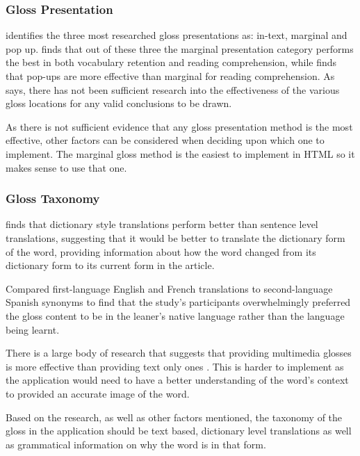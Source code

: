 \subsubsection{Gloss Presentation}

\textcite{chen2016} identifies the three most researched gloss presentations as: in-text, marginal and pop up.  \textcite{abuseileek2008} finds that out of these three the marginal presentation category performs the best in both vocabulary retention and reading comprehension, while \textcite{marefat2016} finds that pop-ups are more effective than marginal for reading comprehension. As \textcite{chen2016} says, there has not been sufficient research into the effectiveness of the various gloss locations for any valid conclusions to be drawn.

As there is not sufficient evidence that any gloss presentation method is the most effective, other factors can be considered when deciding upon which one to implement. The marginal gloss method is the easiest to implement in HTML so it makes sense to use that one. 

\subsubsection{Gloss Taxonomy}

\textcite{gettys2001} finds that dictionary style translations perform better than sentence level translations, suggesting that it would be better
 to translate the dictionary form of the word, providing information about how the word changed from its dictionary form to its current form in the article. 

\textcite{bell2000}  Compared first-language English and French translations to second-language Spanish synonyms to find that the study's participants overwhelmingly preferred the gloss content to be in the leaner's native language rather than the language being learnt. 

There is a large body of research that suggests that providing multimedia glosses is more effective than providing text only ones \autocite{yoshii2006, kost1999}. This is harder to implement  as the application would need to have a better understanding of the word's context to provided an accurate image of the word.

Based on the research, as well as other factors mentioned, the taxonomy of the gloss in the application should be text based, dictionary level translations as well as grammatical information on why the word is in that form. 


